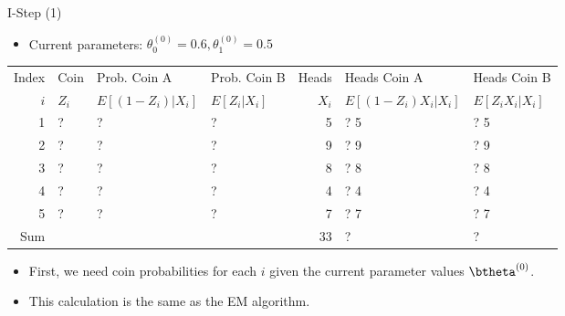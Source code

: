 \documentclass[dvipdfmx,bigger,aspectratio=169]{beamer}
\begin{document}
\begin{frame}[fragile,allowframebreaks,label=,t]{I-Step (1)}
 \begin{itemize}
\item Current parameters: \(\theta_{0}^{(0)} = 0.6, \theta_{1}^{(0)} = 0.5\)
\end{itemize}
\footnotesize
\begin{center}
\begin{tabular}{r|l|ll|r|ll|}
Index & Coin & Prob. Coin A & Prob. Coin B & Heads & Heads Coin A & Heads Coin B\\
\(i\) & \(Z_{i}\) & \(E[(1-Z_{i})\vert X_{i}]\) & \(E[Z_{i}\vert X_{i}]\) & \(X_{i}\) & \(E[(1-Z_{i}) X_{i} \vert X_{i}]\) & \(E[Z_{i} X_{i} \vert X_{i}]\)\\
\hline
1 & ? & ? & ? & 5 & ? \texttimes{} 5 & ? \texttimes{} 5\\
2 & ? & ? & ? & 9 & ? \texttimes{} 9 & ? \texttimes{} 9\\
3 & ? & ? & ? & 8 & ? \texttimes{} 8 & ? \texttimes{} 8\\
4 & ? & ? & ? & 4 & ? \texttimes{} 4 & ? \texttimes{} 4\\
5 & ? & ? & ? & 7 & ? \texttimes{} 7 & ? \texttimes{} 7\\
\hline
Sum &  &  &  & 33 & ? & ?\\
\end{tabular}
\end{center}
\normalsize
\begin{itemize}
\item First, we need coin probabilities for each \(i\) given the current parameter values \(\btheta^{(0)}\).
\item This calculation is the same as the EM algorithm.
\end{itemize}


\end{frame}
\end{document}
